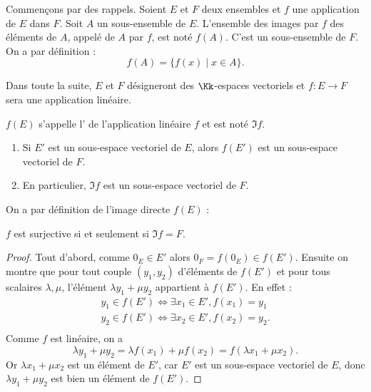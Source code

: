 \documentclass[class=report,crop=false]{standalone}
\begin{document}
Commençons par des rappels.
Soient $E$ et $F$ deux ensembles et $f$ une application de $E$ dans $F$.
Soit $A$ un sous-ensemble de $E$.
L'ensemble des images par $f$ des éléments de $A$, appelé 
de $A$ par $f$, est noté $f(A)$. C'est un sous-ensemble de $F$. On a par définition :
$$f(A)=\big\{ f(x)  \mid x\in A \big\}.$$

\bigskip
Dans toute la suite, $E$ et $F$ désigneront des $\Kk$-espaces vectoriels
et $f : E \to F$ sera une application linéaire.

$f(E)$ s'appelle l' de l'application linéaire $f$ et est noté $\Im f$.


\begin{proposition}
\sauteligne
\begin{enumerate}
  \item Si $E'$ est un sous-espace vectoriel de $E$, alors $f(E')$ est un sous-espace vectoriel de $F$.

  \item En particulier, $\Im f$ est un sous-espace vectoriel de $F$.
\end{enumerate}
 \end{proposition}


\begin{remarque*}
On a par définition de l'image directe $f(E)$ : \\
\centerline{$f$ est surjective si et seulement si $\Im f =F$.}
\end{remarque*}


\begin{proof}
Tout d'abord, comme $0_{E} \in E'$ alors $0_{F} = f(0_{E}) \in f(E')$.
Ensuite on montre que pour tout couple $(y_1,y_2)$ d'éléments  de $f(E')$
et pour tous scalaires $\lambda,\mu$, l'élément $\lambda y_1 + \mu y_2$ appartient à $f(E')$.
En effet :
$$\begin{array}{l}
y_1 \in f(E') \Longleftrightarrow \exists x_1\in E' , f(x_1)=y_1\\
y_2 \in f(E') \Longleftrightarrow \exists x_2\in E' , f(x_2)=y_2.\\
\end{array}$$
Comme $f$ est linéaire, on a
$$\lambda y_1 + \mu y_2=\lambda f(x_1)+ \mu f(x_2) =f(\lambda x_1+ \mu x_2).$$
Or $\lambda x_1 + \mu x_2$ est un élément de $E'$, car $E'$ est un
sous-espace vectoriel de $E$, donc $\lambda y_1 + \mu y_2$ est bien un élément de $f(E')$.

\end{proof}
\end{document}

